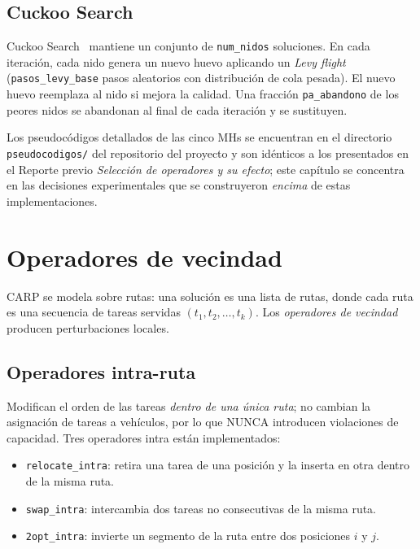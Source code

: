 \subsection{Cuckoo Search}

Cuckoo Search~\cite{yang2009} mantiene un conjunto de \texttt{num\_nidos} soluciones.
En cada iteración, cada nido genera un nuevo huevo aplicando un
\emph{Levy flight} (\texttt{pasos\_levy\_base} pasos aleatorios con
distribución de cola pesada). El nuevo huevo reemplaza al nido si
mejora la calidad. Una fracción \texttt{pa\_abandono} de los peores
nidos se abandonan al final de cada iteración y se sustituyen.

Los pseudocódigos detallados de las cinco MHs se encuentran en el
directorio \texttt{pseudocodigos/} del repositorio del proyecto y son
idénticos a los presentados en el Reporte previo
\emph{Selección de operadores y su efecto}; este capítulo se concentra
en las decisiones experimentales que se construyeron \emph{encima} de
estas implementaciones.

\section{Operadores de vecindad}
\label{sec:operadores}

CARP se modela sobre rutas: una solución es una lista de rutas, donde
cada ruta es una secuencia de tareas servidas $(t_1, t_2, \dots, t_k)$.
Los \emph{operadores de vecindad} producen perturbaciones locales.

\subsection{Operadores intra-ruta}

Modifican el orden de las tareas \emph{dentro de una única ruta}; no
cambian la asignación de tareas a vehículos, por lo que NUNCA introducen
violaciones de capacidad. Tres operadores intra están implementados:

\begin{itemize}
\item \texttt{relocate\_intra}: retira una tarea de una posición y la
  inserta en otra dentro de la misma ruta.
\item \texttt{swap\_intra}: intercambia dos tareas no consecutivas de
  la misma ruta.
\item \texttt{2opt\_intra}: invierte un segmento de la ruta entre dos
  posiciones $i$ y $j$.
\end{itemize}


